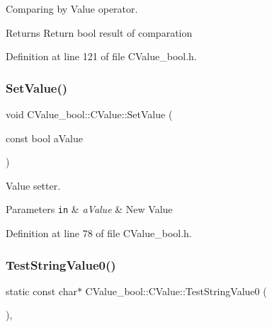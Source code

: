 Comparing by Value operator. 

\begin{DoxyReturn}{Returns}
Return {\ttfamily bool} result of comparation 
\end{DoxyReturn}


Definition at line 121 of file C\+Value\+\_\+bool.\+h.

\mbox{\label{class_c_value__bool_1_1_c_value_ab39b87a635a8d3651fa9bd1d06669d82}} 
\subsubsection{\texorpdfstring{Set\+Value()}{SetValue()}}
{\footnotesize\ttfamily void C\+Value\+\_\+bool\+::\+C\+Value\+::\+Set\+Value (\begin{DoxyParamCaption}\item[{const bool}]{a\+Value }\end{DoxyParamCaption})\hspace{0.3cm}{\ttfamily [inline]}}



Value setter. 


\begin{DoxyParams}[1]{Parameters}
\mbox{\tt in}  & {\em a\+Value} & New Value \\
\hline
\end{DoxyParams}


Definition at line 78 of file C\+Value\+\_\+bool.\+h.

\mbox{\label{class_c_value__bool_1_1_c_value_ae327d8276f5f4c75705c7413d5942ea0}} 
\subsubsection{\texorpdfstring{Test\+String\+Value0()}{TestStringValue0()}}
{\footnotesize\ttfamily static const char$\ast$ C\+Value\+\_\+bool\+::\+C\+Value\+::\+Test\+String\+Value0 (\begin{DoxyParamCaption}{ }\end{DoxyParamCaption})\hspace{0.3cm}{\ttfamily [inline]}, {\ttfamily [static]}}



